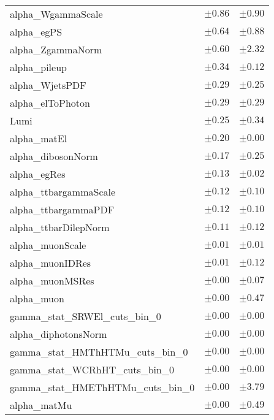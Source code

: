 \begin{table}
\begin{center}
\begin{tabular*}{\textwidth}{@{\extracolsep{\fill}}lcc}
alpha\_WgammaScale         & $\pm 0.86$          & $\pm 0.90$       \\
alpha\_egPS         & $\pm 0.64$          & $\pm 0.88$       \\
alpha\_ZgammaNorm         & $\pm 0.60$          & $\pm 2.32$       \\
alpha\_pileup         & $\pm 0.34$          & $\pm 0.12$       \\
alpha\_WjetsPDF         & $\pm 0.29$          & $\pm 0.25$       \\
alpha\_elToPhoton         & $\pm 0.29$          & $\pm 0.29$       \\
Lumi         & $\pm 0.25$          & $\pm 0.34$       \\
alpha\_matEl         & $\pm 0.20$          & $\pm 0.00$       \\
alpha\_dibosonNorm         & $\pm 0.17$          & $\pm 0.25$       \\
alpha\_egRes         & $\pm 0.13$          & $\pm 0.02$       \\
alpha\_ttbargammaScale         & $\pm 0.12$          & $\pm 0.10$       \\
alpha\_ttbargammaPDF         & $\pm 0.12$          & $\pm 0.10$       \\
alpha\_ttbarDilepNorm         & $\pm 0.11$          & $\pm 0.12$       \\
alpha\_muonScale         & $\pm 0.01$          & $\pm 0.01$       \\
alpha\_muonIDRes         & $\pm 0.01$          & $\pm 0.12$       \\
alpha\_muonMSRes         & $\pm 0.00$          & $\pm 0.07$       \\
alpha\_muon         & $\pm 0.00$          & $\pm 0.47$       \\
gamma\_stat\_SRWEl\_cuts\_bin\_0         & $\pm 0.00$          & $\pm 0.00$       \\
alpha\_diphotonsNorm         & $\pm 0.00$          & $\pm 0.00$       \\
gamma\_stat\_HMThHTMu\_cuts\_bin\_0         & $\pm 0.00$          & $\pm 0.00$       \\
gamma\_stat\_WCRhHT\_cuts\_bin\_0         & $\pm 0.00$          & $\pm 0.00$       \\
gamma\_stat\_HMEThHTMu\_cuts\_bin\_0         & $\pm 0.00$          & $\pm 3.79$       \\
alpha\_matMu         & $\pm 0.00$          & $\pm 0.49$       \\

\end{tabular*}
\end{center}
\end{table}
